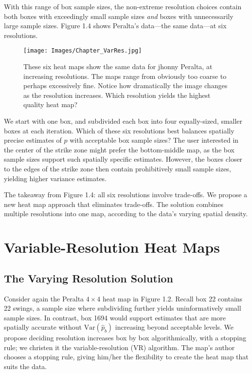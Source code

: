 With this range of box sample sizes, the non-extreme resolution choices contain both boxes with exceedingly small sample sizes {\it and} boxes with unnecessarily large sample sizes. Figure 1.4 shows Peralta's data---the same data---at six resolutions. 
        \begin{figure}[H]
      	\centering
      	\texttt{[image: Images/Chapter\_VarRes.jpg]} 
      	\caption{These six heat maps show the same data for jhonny Peralta, at increasing resolutions. The maps range from obviously too coarse to perhaps excessively fine. Notice how dramatically the image changes as the resolution increases. Which resolution yields the highest quality heat map?}
      	\end{figure} 
We start with one box, and subdivided each box into four equally-sized, smaller boxes at each iteration. Which of these six resolutions best balances spatially precise estimates of $p$ with acceptable box sample sizes? The user interested in the center of the strike zone might prefer the bottom-middle map, as the box sample sizes support such spatially specific estimates. However, the boxes closer to the edges of the strike zone then contain prohibitively small sample sizes, yielding higher variance estimates. 

The takeaway from Figure 1.4: all six resolutions involve trade-offs. We propose a new heat map approach that eliminates trade-offs. The solution combines multiple resolutions into one map, according to the data's varying spatial density.

\section{Variable-Resolution Heat Maps} 

\subsection{The Varying Resolution Solution}

Consider again the Peralta $4 \times 4$ heat map in Figure 1.2. Recall box 22 contains 22 swings, a sample size where subdividing further yields uninformatively small sample sizes. In contrast, box 1694 would support estimates that are more spatially accurate without $\text{Var}(\hat{p}_{b})$ increasing beyond acceptable levels. We propose deciding resolution increases box by box algorithmically, with a stopping rule; we christen it the variable-resolution (VR) algorithm. The map's author chooses a stopping rule, giving him/her the flexibility to create the heat map that suits the data. 

